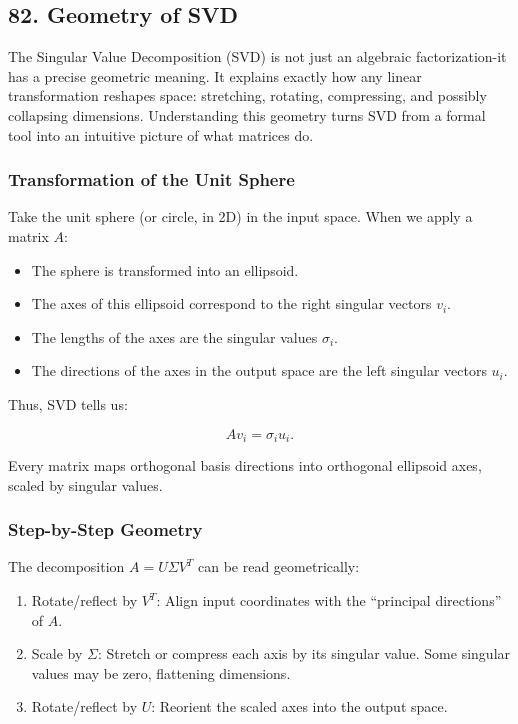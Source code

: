 \documentclass[
  letterpaper,
  DIV=11,
  numbers=noendperiod]{scrreprt}
\providecommand{\tightlist}{%
  \setlength{\itemsep}{0pt}\setlength{\parskip}{0pt}}
\begin{document}
\subsection{82. Geometry of SVD}\label{geometry-of-svd}

The Singular Value Decomposition (SVD) is not just an algebraic
factorization-it has a precise geometric meaning. It explains exactly
how any linear transformation reshapes space: stretching, rotating,
compressing, and possibly collapsing dimensions. Understanding this
geometry turns SVD from a formal tool into an intuitive picture of what
matrices do.

\subsubsection{Transformation of the Unit
Sphere}\label{transformation-of-the-unit-sphere}

Take the unit sphere (or circle, in 2D) in the input space. When we
apply a matrix \(A\):

\begin{itemize}
\tightlist
\item
  The sphere is transformed into an ellipsoid.
\item
  The axes of this ellipsoid correspond to the right singular vectors
  \(v_i\).
\item
  The lengths of the axes are the singular values \(\sigma_i\).
\item
  The directions of the axes in the output space are the left singular
  vectors \(u_i\).
\end{itemize}

Thus, SVD tells us:

\[
A v_i = \sigma_i u_i.
\]

Every matrix maps orthogonal basis directions into orthogonal ellipsoid
axes, scaled by singular values.

\subsubsection{Step-by-Step Geometry}\label{step-by-step-geometry}

The decomposition \(A = U \Sigma V^T\) can be read geometrically:

\begin{enumerate}
\def\labelenumi{\arabic{enumi}.}
\tightlist
\item
  Rotate/reflect by \(V^T\): Align input coordinates with the
  ``principal directions'' of \(A\).
\item
  Scale by \(\Sigma\): Stretch or compress each axis by its singular
  value. Some singular values may be zero, flattening dimensions.
\item
  Rotate/reflect by \(U\): Reorient the scaled axes into the output
  space.
\end{enumerate}
\end{document}
